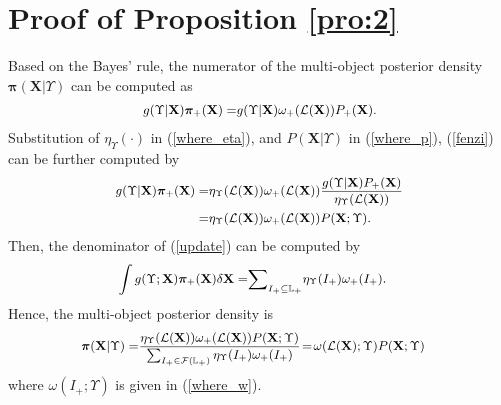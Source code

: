 \documentclass[journal]{IEEEtran}
\newcommand{\bX}{{\mathbf X}}
\newcommand{\bpi}{{\boldsymbol\pi}}
\begin{document}
{\section{Proof of Proposition \ref{pro:2}}
Based on the Bayes' rule, the numerator of the multi-object posterior  density $\bpi(\bX|\Upsilon)$ can be computed as 
\begin{equation}\label{fenzi}
{\small
\begin{split}
g(\Upsilon|\bX)\bpi_+(\bX)=&g(\Upsilon|\bX)\omega_+(\mathcal{L}(\bX))P_+(\bX).\\
\end{split}}
\end{equation}
Substitution of   $\eta_\Upsilon(\cdot)$ in (\ref{where_eta}), and   $P(\bX|\Upsilon)$ in (\ref{where_p}), (\ref{fenzi}) can be further computed by
\begin{equation}\label{fenzi-2}
{\small
\begin{split}
g(\Upsilon|\bX)\bpi_+(\bX)
=&\eta_{\Upsilon}(\mathcal{L}(\bX))\omega_+(\mathcal{L}(\bX))\frac{g(\Upsilon|\bX)P_+(\bX)}{\eta_\Upsilon(\mathcal{L}(\bX))}\\
=&\eta_{\Upsilon}(\mathcal{L}(\bX))\omega_+(\mathcal{L}(\bX))P(\bX;\Upsilon).
\end{split}}
\end{equation}
Then, the denominator of    (\ref{update}) can be computed by
\begin{equation}\label{fenmu}
{\small
\begin{split}
\int g(\Upsilon;\bX)\bpi_+(\bX)\delta \bX=&{\sum}_{I_{+}\subseteq\mathbb{L}_+}\eta_{\Upsilon}(I_{+})\omega_+(I_{+}).\end{split}
}
\end{equation}
Hence, the multi-object posterior density  is
\begin{equation}
\notag
{\small
\begin{split}
\bpi(\bX|\Upsilon)=&\frac{\eta_{\Upsilon}(\mathcal{L}(\bX))\omega_+(\mathcal{L}(\bX))P(\bX;\Upsilon)}{\sum_{I_{+}\in\mathcal{F}(\mathbb{L}_+)}\eta_{\Upsilon}(I_{+})\omega_+(I_{+})}\!=\!
\omega(\mathcal{L}(\bX);\Upsilon)P(\bX;\Upsilon)
\end{split}}
\end{equation}
where $\omega(I_{+};\Upsilon)$ is given in (\ref{where_w}).
}
\end{document}
